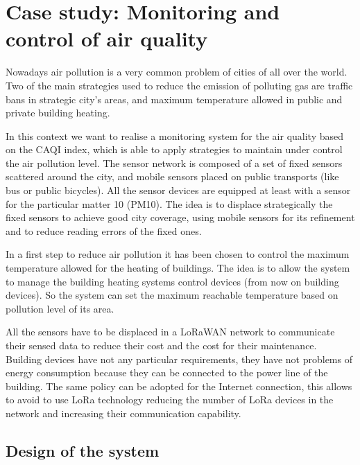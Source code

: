\section{Case study: Monitoring and control of air quality}

\label{sec:case-staudyAC}


Nowadays air pollution is a very common problem of cities of all over the world.
Two of the main strategies used to reduce the emission of polluting gas are traffic bans in strategic city's areas, and maximum temperature allowed in public and private building heating.

In this context we want to realise a monitoring system for the air quality based on the CAQI index, which is able to apply strategies to maintain under control the air pollution level.
The sensor network is composed of a set of fixed sensors scattered around the city, and mobile sensors placed on public transports (like bus or public bicycles).
All the sensor devices are equipped at least with a sensor for the particular matter 10 (PM10).
The idea is to displace strategically the fixed sensors to achieve good city coverage, using mobile sensors for its refinement and to reduce reading errors of the fixed ones.

In a first step to reduce air pollution it has been chosen to control the maximum temperature allowed for the heating of buildings.
The idea is to allow the system to manage the building heating systems control devices (from now on building devices). So the system can set the maximum reachable temperature based on pollution level of its area.

All the sensors have to be displaced in a LoRaWAN network to communicate their sensed data to reduce their cost and the cost for their maintenance. 
Building devices have not any particular requirements, they have not problems of energy consumption because they can be connected to the power line of the building.
The same policy can be adopted for the Internet connection, this allows to avoid to use LoRa technology reducing the number of LoRa devices in the network and increasing their communication capability.

\subsection{Design of the system}

